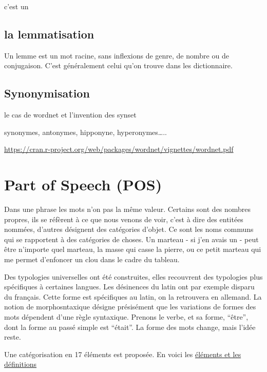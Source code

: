 \documentclass[
]{book}
\begin{document}
c'est un

\hypertarget{la-lemmatisation}{%
\subsection{la lemmatisation}\label{la-lemmatisation}}

Un lemme est un mot racine, sans inflexions de genre, de nombre ou de conjugaison. C'est généralement celui qu'on trouve dans les dictionnaire.

\hypertarget{synonymisation}{%
\subsection{Synonymisation}\label{synonymisation}}

le cas de wordnet et l'invention des synset

synonymes, antonymes, hipponyne, hyperonymes\ldots..

\url{https://cran.r-project.org/web/packages/wordnet/vignettes/wordnet.pdf}

\hypertarget{part-of-speech-pos}{%
\section{Part of Speech (POS)}\label{part-of-speech-pos}}

Dans une phrase les mots n'on pas la même valeur. Certains sont des nombres propres, ils se réfèrent à ce que nous venons de voir, c'est à dire des entitées nommées, d'autres désignent des catégories d'objet. Ce sont les noms communs qui se rapportent à des catégories de choses. Un marteau - si j'en avais un - peut être n'importe quel marteau, la masse qui casse la pierre, ou ce petit marteau qui me permet d'enfoncer un clou dans le cadre du tableau.

Des typologies universelles ont été construites, elles recouvrent des typologies plus spécifiques à certaines langues. Les désinences du latin ont par exemple disparu du français. Cette forme est spécifiques au latin, on la retrouvera en allemand. La notion de morphosntaxique désigne présisément que les variations de formes des mots dépendent d'une règle syntaxique. Prenons le verbe, et sa forme, ``être'', dont la forme au passé simple est ``était''. La forme des mots change, mais l'idée reste.

Une catégorisation en 17 éléments est proposée. En voici les \href{https://universaldependencies.org/u/pos/}{éléments et les définitions}
\end{document}
